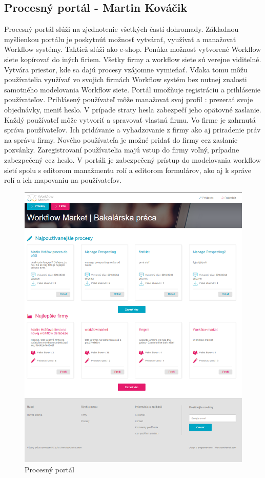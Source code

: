 \subsection{Procesný portál - Martin Kováčik}
Procesný portál slúži na zjednotenie všetkých častí dohromady. Základnou myšlienkou portálu je poskytnúť možnosť vytvárať, využívať a manažovať Workflow systémy. Taktiež slúži ako e-shop. Ponúka možnosť vytvorené Workflow siete kopírovať do iných firiem. Všetky firmy a workflow siete sú verejne viditeľné. Vytvára priestor, kde sa dajú procesy vzájomne vymieňať. Vďaka tomu môžu používatelia využívať vo svojich firmách Workflow systém bez nutnej znalosti samotného modelovania Workflow siete. Portál umožňuje registráciu a prihlásenie používateľov. Prihlásený používateľ  môže manažovať svoj profil : prezerať svoje objednávky, meniť heslo. V prípade straty hesla zabezpečí jeho opätovné zaslanie. Každý používateľ môže vytvoriť a spravovať vlastnú firmu. Vo firme je zahrnutá správa používateľov. Ich pridávanie a vyhadzovanie z firmy ako aj priradenie práv na správu firmy. Nového používateľa je možné pridať do firmy cez zaslanie pozvánky. Zaregistrovaní používatelia majú vstup do firmy voľný, prípadne zabezpečený cez heslo.  V portáli je zabezpečený prístup do modelovania workflow sietí spolu s editorom manažmentu rolí a editorom formulárov, ako aj k správe rolí a ich mapovaniu na používateľov. 

\begin{figure}[h]
	\centering
	\includegraphics[width=0.7\linewidth]{images/martin}
	\caption{Procesný portál}
	\label{fig:procesný portál}
\end{figure}



